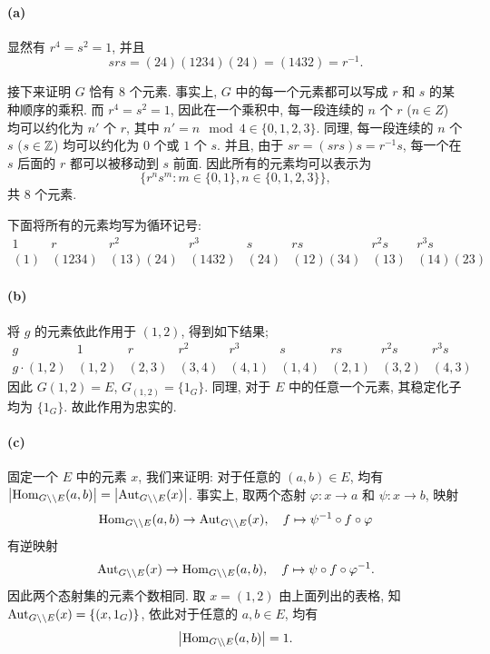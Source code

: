 \documentclass{article}
\begin{document}
\begin{solution}
	\paragraph{(a)} 显然有 $r^4 = s^2 = 1$, 并且 
	\[ srs = (24)(1234)(24) = (1432) = r^{-1}. \]

	接下来证明 $G$ 恰有 $8$ 个元素. 事实上, $G$ 中的每一个元素都可以写成 $r$ 和 $s$ 的某种顺序的乘积. 而 $r^4 = s^2 = 1$, 因此在一个乘积中, 每一段连续的 $n$ 个 $r$ ($n \in Z$) 均可以约化为 $n'$ 个 $r$, 其中 $n' = n \mod 4 \in \{0,1,2,3\}$. 同理, 每一段连续的 $n$ 个 $s$ ($s \in \mathbb{Z}$) 均可以约化为 $0$ 个或 $1$ 个 $s$. 并且, 由于 $sr = (srs)s = r^{-1}s$, 每一个在 $s$ 后面的 $r$ 都可以被移动到 $s$ 前面. 因此所有的元素均可以表示为
	\[ \{r^ns^m: m \in \{0,1\}, n \in \{0,1,2,3\}\}, \]
	共 $8$ 个元素. 

	下面将所有的元素均写为循环记号: 
	\[ \begin{array}{c|c|c|c|c|c|c|c}
		1 & r & r^2 & r^3 & s & rs & r^2s & r^3s \\ \hline 
		(1) & (1234) & (13)(24) & (1432) & (24) & (12)(34) & (13) & (14)(23)
	\end{array} \]

	\paragraph{(b)} 将 $g$ 的元素依此作用于 $(1,2)$, 得到如下结果; 
	\[ \begin{array}{c|cccccccc}
		g & 1 & r & r^2 & r^3 & s & rs & r^2s & r^3s \\ \hline
		g \cdot (1, 2) & (1, 2) & (2, 3) & (3, 4) & (4, 1) & (1, 4) & (2, 1) & (3, 2) & (4, 3)
	\end{array} \]
	因此 $G(1,2) = E$, $G_{(1,2)} = \{1_G\}$. 同理, 对于 $E$ 中的任意一个元素, 其稳定化子均为 $\{1_G\}$. 故此作用为忠实的.

	\paragraph{(c)} 固定一个 $E$ 中的元素 $x$, 我们来证明: 对于任意的 $(a,b) \in E$, 均有 $\left|\operatorname{Hom}_{G\backslash\backslash E}(a,b)\right| = \left|\operatorname{Aut}_{G \backslash\backslash E}(x)\right|$. 事实上, 取两个态射 $\varphi: x \to a$ 和 $\psi: x \to b$, 映射
	\[ \operatorname{Hom}_{G\backslash\backslash E}(a,b) \to \operatorname{Aut}_{G \backslash\backslash E}(x), \quad f \mapsto \psi^{-1} \circ f \circ \varphi \]
	有逆映射
	\[ \operatorname{Aut}_{G \backslash\backslash E}(x) \to \operatorname{Hom}_{G\backslash\backslash E}(a,b), \quad f \mapsto \psi \circ f \circ \varphi^{-1}. \]
	因此两个态射集的元素个数相同. 取 $x = (1,2)$ 由上面列出的表格, 知 $\operatorname{Aut}_{G \backslash \backslash E}(x) = \{(x, 1_G)\}$, 依此对于任意的 $a,b \in E$, 均有
	\[ \left|\operatorname{Hom}_{G\backslash\!\backslash E}(a,b)\right| = 1. \]
\end{solution}
\end{document}
